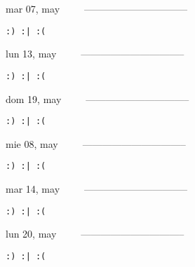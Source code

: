 \documentclass[letterpaper,10pt]{article}
\begin{document}
\begin{multicols}{3}
{mar 07, may\ \ \ \ \ --------------------------------}
\begin{flushright}\begin{small}\texttt{:) :| :(}\end{small}\end{flushright}
\vfill
{lun 13, may\ \ \ \ \ --------------------------------}
\begin{flushright}\begin{small}\texttt{:) :| :(}\end{small}\end{flushright}\par
\vfill
{dom 19, may\ \ \ \ \ --------------------------------}
\begin{flushright}\begin{small}\texttt{:) :| :(}\end{small}\end{flushright}\par
\vfill
\end{multicols}
\vspace{1.05cm}

\begin{multicols}{3}
{mie 08, may\ \ \ \ \ --------------------------------}
\begin{flushright}\begin{small}\texttt{:) :| :(}\end{small}\end{flushright}
\vfill
{mar 14, may\ \ \ \ \ --------------------------------}
\begin{flushright}\begin{small}\texttt{:) :| :(}\end{small}\end{flushright}\par
\vfill
{lun 20, may\ \ \ \ \ --------------------------------}
\begin{flushright}\begin{small}\texttt{:) :| :(}\end{small}\end{flushright}\par
\vfill
\end{multicols}
\vspace{1.05cm}
\end{document}
